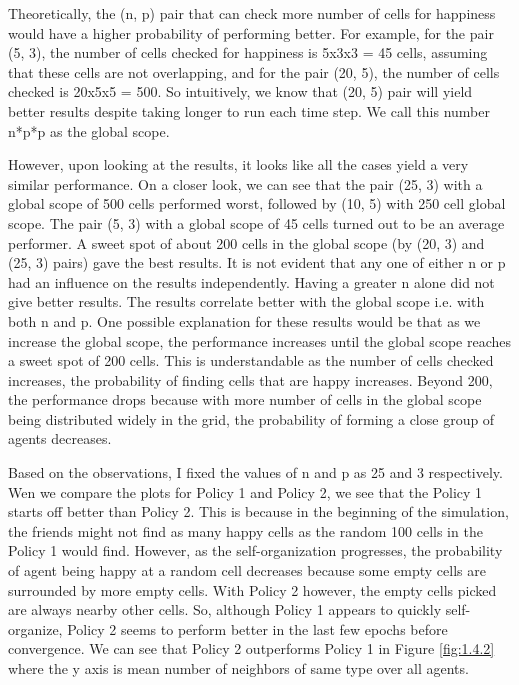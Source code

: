 \documentclass[a4paper,12pt]{article}
\begin{document}
  Theoretically, the (n, p) pair that can check more number of cells for happiness would have a higher probability of performing better. For example, for the pair (5, 3), the number of cells checked for happiness is 5x3x3 = 45 cells, assuming that these cells are not overlapping, and for the pair (20, 5), the number of cells checked is 20x5x5 = 500. So intuitively, we know that (20, 5) pair will yield better results despite taking longer to run each time step. We call this number n*p*p as the global scope.

  However, upon looking at the results, it looks like all the cases yield a very similar performance. On a closer look, we can see that the pair (25, 3) with a global scope of 500 cells performed worst, followed by (10, 5) with 250 cell global scope. The pair (5, 3) with a global scope of 45 cells turned out to be an average performer. A sweet spot of about 200 cells in the global scope (by (20, 3) and (25, 3) pairs) gave the best results.
  It is not evident that any one of either n or p had an influence on the results independently. Having a greater n alone did not give better results. The results correlate better with the global scope i.e. with both n and p.
  One possible explanation for these results would be that as we increase the global scope, the performance increases until the global scope reaches a sweet spot of 200 cells. This is understandable as the number of cells checked increases, the probability of finding cells that are happy increases. Beyond 200, the performance drops because with more number of cells in the global scope being distributed widely in the grid, the probability of forming a close group of agents decreases.

  Based on the observations, I fixed the values of n and p as 25 and 3 respectively. Wen we compare the plots for Policy 1 and Policy 2, we see that the Policy 1 starts off better than Policy 2. This is because in the beginning of the simulation, the friends might not find as many happy cells as the random 100 cells in the Policy 1 would find. However, as the self-organization progresses, the probability of agent being happy at a random cell decreases because some empty cells are surrounded by more empty cells. With Policy 2 however, the empty cells picked are always nearby other cells. So, although Policy 1 appears to quickly self-organize, Policy 2 seems to perform better in the last few epochs before convergence. We can see that Policy 2 outperforms Policy 1 in Figure \ref{fig:1.4.2} where the y axis is mean number of neighbors of same type over all agents.
\end{document}
